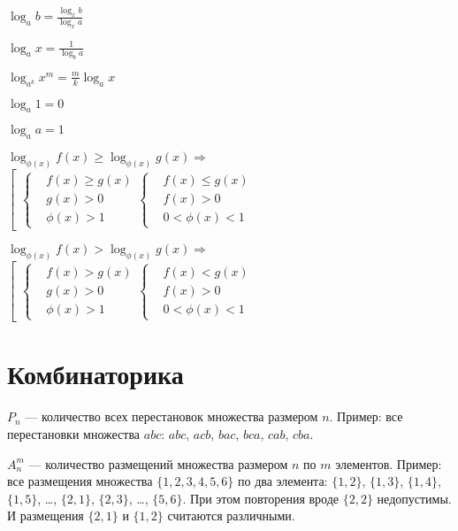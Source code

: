 $ \log_a b = \frac{\log_x b}{\log_x a} $

$ \log_a x = \frac{1}{\log_b a} $

$ \log_{a^k} x^m = \frac{m}{k} \log_a x $

$ \log_a 1 = 0 $

$ \log_a a = 1 $

$ \log_{\phi(x)} f(x) \ge \log_{\phi(x)} g(x) \Rightarrow $ $ \left[
	\begin{aligned}
		\left\{ \begin{aligned}
			& f(x) \ge g(x) \\
			& g(x) > 0 \\
			& \phi(x) > 1
		\end{aligned} \right.
		\left\{ \begin{aligned}
			& f(x) \le g(x) \\
			& f(x) > 0 \\
			& 0 < \phi(x) < 1
		\end{aligned} \right.
	\end{aligned} \right. $

$ \log_{\phi(x)} f(x) > \log_{\phi(x)} g(x) \Rightarrow $ $ \left[
	\begin{aligned}
		\left\{ \begin{aligned}
			& f(x) > g(x) \\
			& g(x) > 0 \\
			& \phi(x) > 1
		\end{aligned} \right.
		\left\{ \begin{aligned}
			& f(x) < g(x) \\
			& f(x) > 0 \\
			& 0 < \phi(x) < 1
		\end{aligned} \right.
	\end{aligned} \right. $

	
\section{Комбинаторика}

$ P_n $ --- количество всех перестановок множества размером $ n $. Пример: все перестановки множества $abc$: $abc$, $acb$, $bac$, $bca$, $cab$, $cba$.

$ A^m_n $ --- количество размещений множества размером $ n $ по $ m $ элементов. Пример: все размещения множества $ \{1, 2, 3, 4, 5, 6 \} $ по два элемента: $ \{1, 2\} $, $ \{1, 3\} $, $ \{1, 4\} $, $ \{1, 5\} $, \dots, $ \{2, 1\} $, $ \{2, 3\} $,  \dots, $ \{5, 6\} $. При этом повторения вроде $ \{2, 2\} $ недопустимы. И размещения $ \{2, 1 \} $ и $ \{ 1, 2 \} $ считаются различными.

